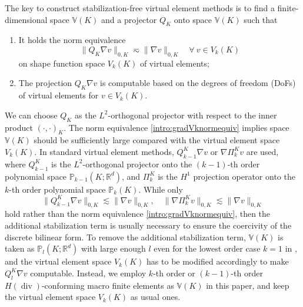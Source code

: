 \documentclass[10pt]{amsart}
\renewcommand{\div}{\operatorname{div}}
\numberwithin{equation}{section}
\begin{document}
The key to construct stabilization-free virtual element methods is to find a finite-dimensional space $\mathbb{V}(K)$ and a projector $Q_K$ onto space $\mathbb{V}(K)$ such that
\begin{enumerate}[(C1)]
\item It holds the norm equivalence 
\begin{equation}\label{intro:gradVknormequiv} 
\|Q_{K}\nabla v\|_{0,K}\eqsim \|\nabla v\|_{0,K} \quad \forall~v\in V_k(K)
\end{equation}
on shape function space $V_k(K)$ of virtual elements;
\item The projection $Q_{K}\nabla v$ is computable based on the degrees of freedom (DoFs) of virtual elements for $v\in V_k(K)$.
\end{enumerate}
We can choose $Q_{K}$ as the $L^2$-orthogonal projector with respect to the
inner product $(\cdot, \cdot)_K$. The norm equivalence
\eqref{intro:gradVknormequiv} implies space $\mathbb{V}(K)$ should be
sufficiently large compared with the virtual element space $V_k(K)$.  In
standard virtual element methods, $Q_{k-1}^{K}\nabla v$
\cite{BeiraodaVeigaBrezziMariniRusso2016} or $\nabla\Pi_k^{K}v$
\cite{BeiraoBrezziCangianiManziniEtAl2013,BeiraoBrezziMariniRusso2014,AhmadAlsaediBrezziMariniEtAl2013,AyusodeDiosLipnikovManzini2016}
are used, where $Q_{k-1}^{K}$ is the $L^2$-orthogonal projector onto the
$(k-1)$-th order polynomial space $\mathbb P_{k-1}(K; \mathbb{R}^d)$, and
$\Pi_k^{K}$ is the $H^1$ projection operator onto the $k$-th order polynomial
space $\mathbb P_{k}(K)$.  While only
\[
\|Q_{k-1}^{K}\nabla v\|_{0,K}\lesssim \|\nabla v\|_{0,K}, \quad \|\nabla\Pi_k^{K}v\|_{0,K}\lesssim \|\nabla v\|_{0,K}
\]
hold
rather than the norm equivalence \eqref{intro:gradVknormequiv}, then the additional stabilization term is usually necessary to ensure the coercivity of the discrete bilinear form.
To remove the additional stabilization term, $\mathbb{V}(K)$ is taken as $\mathbb P_{l}(K; \mathbb{R}^d)$ with large enough $l$ even for the lowest order case $k=1$ in \cite{BerroneBorioMarcon2021,BerroneBorioMarcon2022,DAltriMirandaPatrunoSacco2021}, and the virtual element space $V_k(K)$ has to be modified accordingly to make $Q_{l}^{K}\nabla v$ computable.
Instead, we employ $k$-th order or $(k-1)$-th order $H(\div)$-conforming macro finite elements as $\mathbb{V}(K)$ in this paper, and keep the virtual element space $V_k(K)$ as usual ones.
\end{document}
